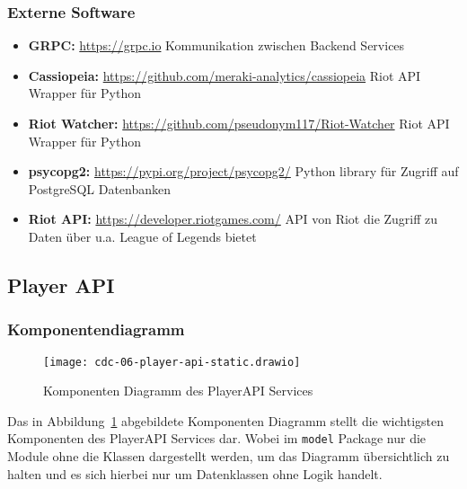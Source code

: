 \subsubsection{Externe Software}
\begin{itemize}

\item \textbf{GRPC:} \href{https://grpc.io/docs/languages/python/basics/}{https://grpc.io} Kommunikation zwischen Backend Services\\
\item \textbf{Cassiopeia:} \href{https://github.com/meraki-analytics/cassiopeia}{https://github.com/meraki-analytics/cassiopeia} Riot API Wrapper für Python\\
\item \textbf{Riot Watcher:} \href{https://github.com/pseudonym117/Riot-Watcher}{https://github.com/pseudonym117/Riot-Watcher} Riot API Wrapper für Python\\
\item \textbf{psycopg2:} \href{https://pypi.org/project/psycopg2/}{https://pypi.org/project/psycopg2/} Python library für Zugriff auf PostgreSQL Datenbanken \\
\item \textbf{Riot API:} \href{https://developer.riotgames.com/}{https://developer.riotgames.com/} API von Riot die Zugriff zu Daten über u.a. League of Legends bietet\\

\end{itemize}

\subsection{Player API}

\subsubsection{Komponentendiagramm}\label{subsubsec:player-api-component-diagram}

\begin{figure}
    \centering
    \texttt{[image: cdc-06-player-api-static.drawio]}
    \caption{Komponenten Diagramm des PlayerAPI Services}
    \label{fig:player-api-component-diagram}
\end{figure}
Das in Abbildung~\ref{fig:player-api-component-diagram} abgebildete Komponenten Diagramm stellt die wichtigsten
Komponenten des PlayerAPI Services dar.
Wobei im \lstinline!model! Package nur die Module ohne die Klassen dargestellt werden, um das Diagramm
übersichtlich zu halten und es sich hierbei nur um Datenklassen ohne Logik handelt.


